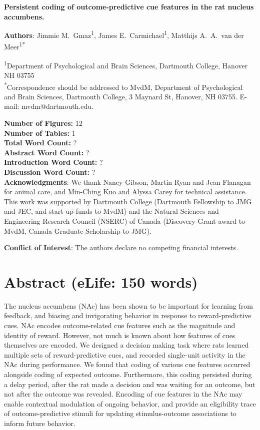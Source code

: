 \documentclass[11pt]{article}
\begin{document}
{\Large\bf Persistent coding of outcome-predictive cue features in the
  rat nucleus accumbens.}

{\bf Authors}: Jimmie M.\ Gmaz\textsuperscript{1}, James
E.\ Carmichael\textsuperscript{1}, Matthijs A.\ A.\ van der
Meer\textsuperscript{1*}

\textsuperscript{1}Department of Psychological and Brain Sciences,
Dartmouth College, Hanover NH
03755\\ 

\textsuperscript{*}Correspondence should be addressed to MvdM,
Department of Psychological and Brain Sciences, Dartmouth College, 3
Maynard St, Hanover, NH 03755. E-mail: {\sffamily mvdm@dartmouth.edu}.

\textbf{Number of Figures:} 12\\
\textbf{Number of Tables:} 1\\
\textbf{Total Word Count:} ?\\
\textbf{Abstract Word Count:} ?\\
\textbf{Introduction Word Count:} ?\\
\textbf{Discussion Word Count:} ?\\

\textbf{Acknowledgments}: We thank Nancy Gibson, Martin Ryan and Jean
Flanagan for animal care, and Min-Ching Kuo and
Alyssa Carey for technical assistance. This work was supported by
Dartmouth College (Dartmouth Fellowship to JMG and JEC, and start-up funds to
MvdM) and the Natural Sciences and Engineering Research Council
(NSERC) of Canada (Discovery Grant award to MvdM, Canada Graduate
Scholarship to JMG).

\textbf{Conflict of Interest}: The authors declare no competing
financial interests.\\

\newpage
\linenumbers

\section*{Abstract (eLife: 150 words)}

The nucleus accumbens (NAc) has been shown to be important for
learning from feedback, and biasing and invigorating behavior in
response to reward-predictive cues. NAc encodes outcome-related cue
features such as the magnitude and identity of reward. However, not
much is known about how features of cues themselves are encoded.  We
designed a decision making task where rats learned multiple sets of
reward-predictive cues, and recorded single-unit activity in the NAc
during performance. We found that coding of various cue features
occurred alongside coding of expected outcome. Furthermore, this
coding persisted during a delay period, after the rat made a decision
and was waiting for an outcome, but not after the outcome was
revealed. Encoding of cue features in the NAc may enable contextual
modulation of ongoing behavior, and provide an eligibility trace of
outcome-predictive stimuli for updating stimulus-outcome associations
to inform future behavior.
\end{document}
